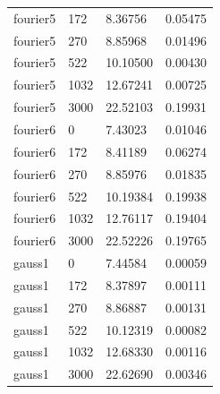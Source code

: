 \begin{longtable}{p{2.0cm} p{2.0cm} p{4.0cm} p{2.0cm}}
        fourier5  & 172          & 8.36756          & 0.05475 \\
        fourier5  & 270          & 8.85968          & 0.01496 \\
        fourier5  & 522          & 10.10500         & 0.00430 \\
        fourier5  & 1032         & 12.67241         & 0.00725 \\
        fourier5  & 3000         & 22.52103         & 0.19931 \\
        \midrule
        fourier6  & 0            & 7.43023          & 0.01046 \\
        fourier6  & 172          & 8.41189          & 0.06274 \\
        fourier6  & 270          & 8.85976          & 0.01835 \\
        fourier6  & 522          & 10.19384         & 0.19938 \\
        fourier6  & 1032         & 12.76117         & 0.19404 \\
        fourier6  & 3000         & 22.52226         & 0.19765 \\
        \midrule
        gauss1    & 0            & 7.44584          & 0.00059 \\
        gauss1    & 172          & 8.37897          & 0.00111 \\
        gauss1    & 270          & 8.86887          & 0.00131 \\
        gauss1    & 522          & 10.12319         & 0.00082 \\
        gauss1    & 1032         & 12.68330         & 0.00116 \\
        gauss1    & 3000         & 22.62690         & 0.00346
    
\end{longtable}

